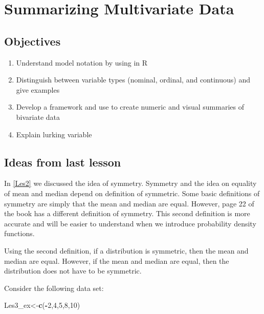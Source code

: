 \documentclass[]{book}
\newenvironment{Shaded}{\begin{snugshade}}{\end{snugshade}}
\newcommand{\KeywordTok}[1]{\textcolor[rgb]{0.13,0.29,0.53}{\textbf{#1}}}
\newcommand{\DecValTok}[1]{\textcolor[rgb]{0.00,0.00,0.81}{#1}}
\newcommand{\OperatorTok}[1]{\textcolor[rgb]{0.81,0.36,0.00}{\textbf{#1}}}
\newcommand{\NormalTok}[1]{#1}
\providecommand{\tightlist}{%
  \setlength{\itemsep}{0pt}\setlength{\parskip}{0pt}}
\theoremstyle{definition}
\theoremstyle{definition}
\theoremstyle{definition}
\theoremstyle{remark}
\begin{document}
\hypertarget{L3}{\section{Summarizing Multivariate Data}\label{L3}}

\subsection{Objectives}\label{objectives-2}

\begin{enumerate}
\def\labelenumi{\arabic{enumi}.}
\tightlist
\item
  Understand model notation by using in R
\item
  Distinguish between variable types (nominal, ordinal, and continuous)
  and give examples
\item
  Develop a framework and use to create numeric and visual summaries of
  bivariate data
\item
  Explain lurking variable
\end{enumerate}

\subsection{Ideas from last lesson}\label{ideas-from-last-lesson}

In \ref{Les2} we discussed the idea of symmetry. Symmetry and the idea
on equality of mean and median depend on definition of symmetric. Some
basic definitions of symmetry are simply that the mean and median are
equal. However, page 22 of the book has a different definition of
symmetry. This second definition is more accurate and will be easier to
understand when we introduce probability density functions.

Using the second definition, if a distribution is symmetric, then the
mean and median are equal. However, if the mean and median are equal,
then the distribution does not have to be symmetric.

Consider the following data set:

\begin{Shaded}
\begin{Highlighting}[]
\NormalTok{Les3_ex<-}\KeywordTok{c}\NormalTok{(}\OperatorTok{-}\DecValTok{2}\NormalTok{,}\DecValTok{4}\NormalTok{,}\DecValTok{5}\NormalTok{,}\DecValTok{8}\NormalTok{,}\DecValTok{10}\NormalTok{)}
\end{Highlighting}
\end{Shaded}
\end{document}

